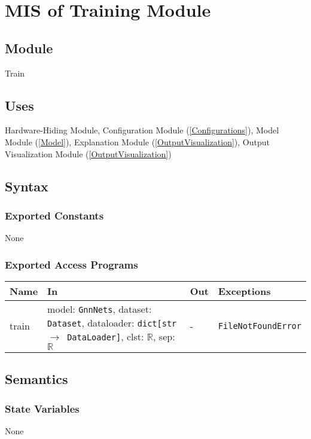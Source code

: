 \documentclass[12pt, titlepage]{article}
\begin{document}
\section{MIS of Training Module} \label{Train} 

\subsection{Module}
Train

\subsection{Uses}
Hardware-Hiding Module, Configuration Module (\ref{Configurations}), Model Module (\ref{Model}), Explanation Module (\ref{OutputVisualization}), Output Visualization Module (\ref{OutputVisualization})

\subsection{Syntax}

\subsubsection{Exported Constants}
None

\subsubsection{Exported Access Programs}

\begin{center}
\begin{tabular}{p{2cm} p{6cm} p{4cm} p{3.5cm}}
\hline
\textbf{Name} & \textbf{In} & \textbf{Out} & \textbf{Exceptions} \\
\hline
train & model: \texttt{GnnNets}, dataset: \texttt{Dataset}, dataloader: \texttt{dict[str \(\rightarrow\) DataLoader]}, clst: \(\mathbb{R}\), sep: \(\mathbb{R}\) & - & \texttt{FileNotFoundError} \\
\hline
\end{tabular}
\end{center}

\subsection{Semantics}

\subsubsection{State Variables}
None
\end{document}
